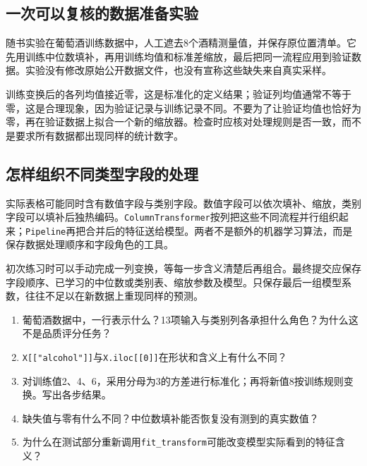\subsection{一次可以复核的数据准备实验}
随书实验在葡萄酒训练数据中，人工遮去8个酒精测量值，并保存原位置清单。它先用训练中位数填补，再用训练均值和标准差缩放，最后把同一流程应用到验证数据。实验没有修改原始公开数据文件，也没有宣称这些缺失来自真实采样。

训练变换后的各列均值接近零，这是标准化的定义结果；验证列均值通常不等于零，这是合理现象，因为验证记录与训练记录不同。不要为了让验证均值也恰好为零，再在验证数据上拟合一个新的缩放器。检查时应核对处理规则是否一致，而不是要求所有数据都出现同样的统计数字。

\subsection{怎样组织不同类型字段的处理}
实际表格可能同时含有数值字段与类别字段。数值字段可以依次填补、缩放，类别字段可以填补后独热编码。\texttt{ColumnTransformer}按列把这些不同流程并行组织起来；\texttt{Pipeline}再把合并后的特征送给模型。两者不是额外的机器学习算法，而是保存数据处理顺序和字段角色的工具。

初次练习时可以手动完成一列变换，等每一步含义清楚后再组合。最终提交应保存字段顺序、已学习的中位数或类别表、缩放参数及模型。只保存最后一组模型系数，往往不足以在新数据上重现同样的预测。

\chapterexercise
\begin{enumerate}
\item 葡萄酒数据中，一行表示什么？13项输入与类别列各承担什么角色？为什么这不是品质评分任务？
\item \texttt{X[["alcohol"]]}与\texttt{X.iloc[[0]]}在形状和含义上有什么不同？
\item 对训练值2、4、6，采用分母为3的方差进行标准化；再将新值8按训练规则变换。写出各步结果。
\item 缺失值与零有什么不同？中位数填补能否恢复没有测到的真实数值？
\item 为什么在测试部分重新调用\texttt{fit\_transform}可能改变模型实际看到的特征含义？
\end{enumerate}

